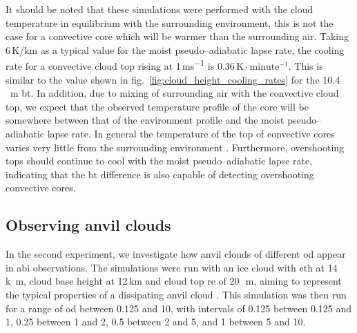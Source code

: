 It should be noted that these simulations were performed with the cloud temperature in equilibrium with the surrounding environment, this is not the case for a convective core which will be warmer than the surrounding air.
Taking 6\,\unit{K/km} as a typical value for the moist pseudo--adiabatic lapse rate, the cooling rate for a convective cloud top rising at 1\,\unit{ms^{-1}} is 0.36\,$\mathrm{K \cdot minute^{-1}}$.
This is similar to the value shown in fig.~\ref{fig:cloud_height_cooling_rates} for the 10.4\,\unit{\mu m} \acrshort{bt}.
In addition, due to mixing of surrounding air with the convective cloud top, we expect that the observed temperature profile of the core will be somewhere between that of the environment profile and the moist pseudo--adiabatic lapse rate.
In general the temperature of the top of convective cores varies very little from the surrounding environment \citep{zipser_cumulonimbus_1980}.
Furthermore, overshooting tops should continue to cool with the moist pseudo--adiabatic lapse rate, indicating that the \acrshort{bt} difference is also capable of detecting overshooting convective cores.

\subsection{Observing anvil clouds} \label{sec:theory_anvil}

In the second experiment, we investigate how anvil clouds of different \acrfull{od} appear in \acrshort{abi} observations.
The simulations were run with an ice cloud with \acrshort{cth} at 14\,\unit{k m}, cloud base height at 12\,\unit{km} and cloud top \acrshort{re} of 20\,\unit{\mu m}, aiming to represent the typical properties of a dissipating anvil cloud \citep{sokol_tropical_2020}.
This simulation was then run for a range of \acrshort{od} between 0.125 and 10, with intervals of 0.125 between 0.125 and 1, 0.25 between 1 and 2, 0.5 between 2 and 5, and 1 between 5 and 10.

